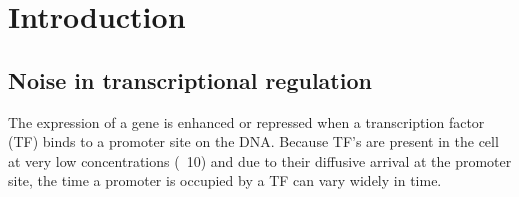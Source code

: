 \section{Introduction}

\subsection{Noise in transcriptional regulation}

The expression of a gene is enhanced or repressed when a transcription factor (TF) binds to a promoter site on the DNA. Because TF's are present in the cell at very low concentrations (~10) and due to their diffusive arrival at the promoter site, the time a promoter is occupied by a TF can vary widely in time. 